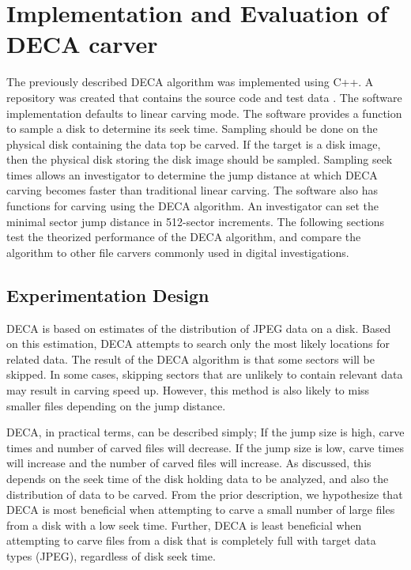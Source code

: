 \documentclass[final,5p,times,twocolumn,authoryear]{elsarticle}
\begin{document}
\section{Implementation and Evaluation of DECA carver} \label{sec:implement}
The previously described DECA algorithm was implemented using C++. A repository was created that contains the source code and test data \citep{gladyshevjames2015}. The software implementation defaults to linear carving mode. The software provides a function to sample a disk to determine its seek time. Sampling should be done on the physical disk containing the data top be carved. If the target is a disk image, then the physical disk storing the disk image should be sampled. Sampling seek times allows an investigator to determine the jump distance at which DECA carving becomes faster than traditional linear carving. The software also has functions for carving using the DECA algorithm. An investigator can set the minimal sector jump distance in 512-sector increments. The following sections test the theorized performance of the DECA algorithm, and compare the algorithm to other file carvers commonly used in digital investigations.

\subsection{Experimentation Design}
DECA is based on estimates of the distribution of JPEG data on a disk. Based on this estimation, DECA attempts to search only the most likely locations for related data. The result of the DECA algorithm is that some sectors will be skipped. In some cases, skipping sectors that are unlikely to contain relevant data may result in carving speed up. However, this method is also likely to miss smaller files depending on the jump distance.

DECA, in practical terms, can be described simply; If the jump size is high, carve times and number of carved files will decrease. If the jump size is low, carve times will increase and the number of carved files will increase. As discussed, this depends on the seek time of the disk holding data to be analyzed, and also the distribution of data to be carved. From the prior description, we hypothesize that DECA is most beneficial when attempting to carve a small number of large files from a disk with a low seek time. Further, DECA is least beneficial when attempting to carve files from a disk that is completely full with target data types (JPEG), regardless of disk seek time.
\end{document}
